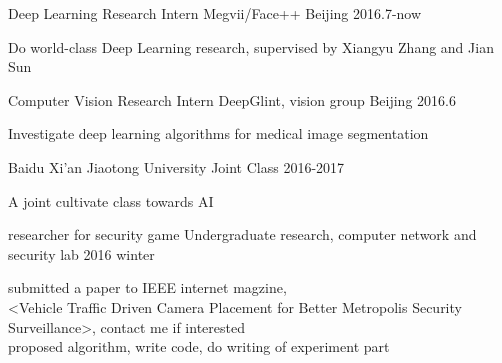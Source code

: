 

\begin{cventries}
	\cventry
	{Deep Learning Research Intern} %
	{Megvii/Face++} %
	{Beijing} %
	{2016.7-now} %
	{
		\begin{cvitems} %
			\item {Do world-class Deep Learning research, supervised by Xiangyu Zhang and Jian Sun}
		\end{cvitems}
	}
	
  \cventry
    {Computer Vision Research Intern} %
    {DeepGlint, vision group} %
    {Beijing} %
    {2016.6} %
    {
      \begin{cvitems} %
        \item {Investigate deep learning algorithms for medical image segmentation}
      \end{cvitems}
    }
    
  \cventry
    { } %
    {Baidu Xi'an Jiaotong University Joint Class} %
    { } %
    {2016-2017} %
    {
      \begin{cvitems} %
        \item {A joint cultivate class towards AI}
      \end{cvitems}
    }
    
  \cventry
    {researcher for security game} %
    {Undergraduate research, computer network and security lab} %
    { } %
    {2016 winter} %
    {
      \begin{cvitems} %
        \item {submitted a paper to IEEE internet magzine,\\
        <Vehicle Traffic Driven Camera Placement for Better Metropolis Security Surveillance>, contact me if interested\\
        proposed algorithm, write code, do writing of experiment part}
      \end{cvitems}
    }


\end{cventries}

